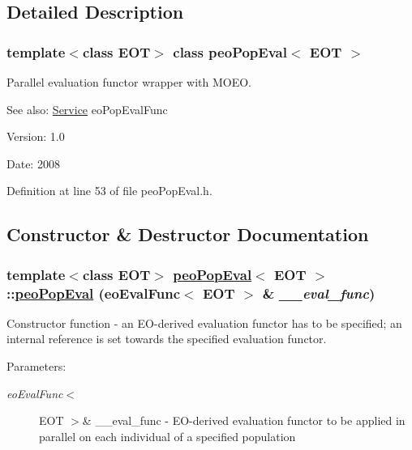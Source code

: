 \subsection{Detailed Description}
\subsubsection*{template$<$class EOT$>$ class peo\-Pop\-Eval$<$ EOT $>$}

Parallel evaluation functor wrapper with MOEO. 

\begin{Desc}
\item[See also:]\hyperlink{classService}{Service} eo\-Pop\-Eval\-Func \end{Desc}
\begin{Desc}
\item[Version:]1.0 \end{Desc}
\begin{Desc}
\item[Date:]2008 \end{Desc}




Definition at line 53 of file peo\-Pop\-Eval.h.

\subsection{Constructor \& Destructor Documentation}
\hypertarget{classpeoPopEval_878297ba0de14593bd9cc03b2daf52df}{
\subsubsection[peoPopEval]{\setlength{\rightskip}{0pt plus 5cm}template$<$class EOT$>$ \hyperlink{classpeoPopEval}{peo\-Pop\-Eval}$<$ EOT $>$::\hyperlink{classpeoPopEval}{peo\-Pop\-Eval} (eo\-Eval\-Func$<$ EOT $>$ \& {\em \_\-\_\-eval\_\-func})}}
\label{classpeoPopEval_878297ba0de14593bd9cc03b2daf52df}


Constructor function - an EO-derived evaluation functor has to be specified; an internal reference is set towards the specified evaluation functor. 

\begin{Desc}
\item[Parameters:]
\begin{description}
\item[{\em eo\-Eval\-Func$<$}]EOT $>$\& \_\-\_\-eval\_\-func - EO-derived evaluation functor to be applied in parallel on each individual of a specified population \end{description}
\end{Desc}


